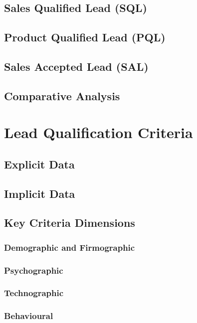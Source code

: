     \subsection{Sales Qualified Lead (SQL)}\mbox{}
    \subsection{Product Qualified Lead (PQL)}\mbox{}
    \subsection{Sales Accepted Lead (SAL)}\mbox{}
    \subsection{Comparative Analysis}\mbox{}

\section{Lead Qualification Criteria}\mbox{}
    \subsection{Explicit Data}\mbox{}
    \subsection{Implicit Data}\mbox{}
    \subsection{Key Criteria Dimensions}\mbox{}
        \subsubsection{Demographic and Firmographic}\mbox{}
        \subsubsection{Psychographic}\mbox{}
        \subsubsection{Technographic}\mbox{}
        \subsubsection{Behavioural}\mbox{}

